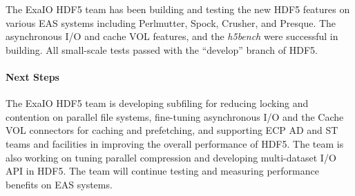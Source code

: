 
The ExaIO HDF5 team has been building and testing the new HDF5 features on various EAS systems including Perlmutter, Spock, Crusher, and Presque. The asynchronous I/O and cache VOL features, and the \emph{h5bench} were successful in building. All small-scale tests passed with the ``develop'' branch of HDF5. 

\paragraph{Next Steps}

The ExaIO HDF5 team is developing subfiling for reducing locking and contention on parallel file systems,  fine-tuning asynchronous I/O and the Cache VOL connectors for caching and prefetching, and supporting ECP AD and ST teams and facilities in improving the overall performance of HDF5. The team is also working on tuning parallel compression and developing multi-dataset I/O API in HDF5. The team will continue testing and measuring performance benefits on EAS systems. 
